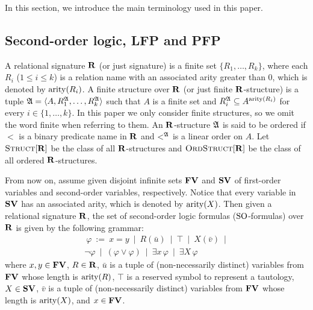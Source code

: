
In this section, we introduce the main terminology used in this paper.

\subsection{Second-order logic, LFP and PFP}
A relational signature $\mathbf{R}$ (or just signature) is a finite set $\{R_1, \ldots, R_k\}$, where each $R_i$ ($1 \leq i \leq k$) is a relation name with an associated arity greater than 0, which is denoted by ${\rm arity}(R_i)$. A finite structure over $\mathbf{R}$ (or just finite $\mathbf{R}$-structure) is a tuple $\mathfrak{A} = \langle A, R_1^{\mathfrak{A}}, \ldots, R_k^{\mathfrak{A}} \rangle$ such that $A$ is a finite set and $R_i^{\mathfrak{A}} \subseteq A^{{\rm arity}(R_i)}$ for every $i \in \{1, \ldots, k\}$. In this paper we only consider finite structures, so we omit the word finite when referring to them. An $\mathbf{R}$-structure $\mathfrak{A}$ is said to be ordered if $<$ is a binary predicate name in $\mathbf{R}$ and $<^{\mathfrak{A}}$ is a linear order on $A$. Let $\text{\sc Struct}[\mathbf{R}]$ be the class of all $\mathbf{R}$-structures and $\text{\sc OrdStruct}[\mathbf{R}]$ be the class of all ordered $\mathbf{R}$-structures. 

From now on, assume given disjoint infinite sets $\mathbf{FV}$ and $\mathbf{SV}$ of first-order variables and second-order variables, respectively. Notice that every variable in $\mathbf{SV}$ has an associated arity, which is denoted by ${\rm arity}(X)$. Then given a relational signature $\mathbf{R}$, the set of second-order logic formulas (${\rm SO}$-formulas) over $\mathbf{R}$ is given by the following grammar:
\begin{multline*}\ 
	\varphi \ := \ x = y \ \mid \ R(\bar u) \ \mid \ \top  \ \mid\  
	X(\bar v)  \ \mid\\ 
	\neg \varphi \ \mid\ 
	(\varphi \vee \varphi) \ \mid\ 
	\exists x \, \varphi \ \mid\ 
	\exists X \, \varphi
\end{multline*}
where $x,y \in \mathbf{FV}$, $R \in \mathbf{R}$, $\bar u$ is a tuple of (non-necessarily distinct) variables from $\mathbf{FV}$ whose length is ${\rm arity}(R)$, $\top$ is a reserved symbol to represent a tautology, $X \in \mathbf{SV}$, $\bar v$ is a tuple of (non-necessarily distinct) variables from $\mathbf{FV}$ whose length is ${\rm arity}(X)$, and $x \in \mathbf{FV}$. 



